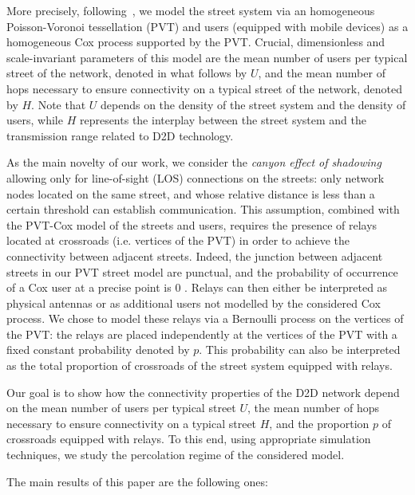 \documentclass[conference]{IEEEtran}
\begin{document}
\noindent More precisely, following~\cite{cali2018percolation}, we model the street system via an  homogeneous  Poisson-Voronoi
tessellation (PVT) and  users (equipped with mobile devices) as a
homogeneous Cox process supported by the PVT. Crucial,
dimensionless and scale-invariant parameters of this model are the mean number of users per
typical street of the network,  denoted in what follows by $U$, 
and the mean number of hops necessary to
ensure connectivity on a typical street of the network, denoted
by $H$. Note that $U$ depends on the density of the street system and the density of users,
while $H$ represents the interplay between the street system 
and the transmission range related to D2D technology.

As the main novelty of our work, we consider  the {\em canyon effect
  of shadowing}  allowing  only for  line-of-sight (LOS) connections
on the streets: only network nodes located on
the  same street, and whose relative distance is less than a certain
threshold can establish communication.
This assumption, combined
with the PVT-Cox  model of the streets and users, requires the presence of relays located
at crossroads (i.e. vertices of the PVT) in order to achieve the connectivity between adjacent
streets. Indeed, the junction between adjacent streets in our PVT street model are punctual, and the probability of occurrence of a Cox user at a precise point is 0 \cite[Section 5.2]{chiu_stochastic_2013}. Relays can then either be interpreted as physical antennas or as additional users not modelled by the considered Cox process.
We chose to model these relays via a Bernoulli process \cite[Section 2.2]{chiu_stochastic_2013}
on the vertices of the PVT: the relays are placed independently at 
the vertices  of the PVT with a fixed constant probability denoted
by $p$. This probability can also be interpreted as the total proportion of crossroads of the street system equipped with relays. 

Our goal is to show how  the  connectivity properties of the D2D network
depend on  the mean number of users per
typical street $U$, the mean number of hops necessary to
ensure connectivity on a typical street $H$, and the  proportion $p$ of
crossroads equipped with relays. 
To this end, using appropriate simulation techniques,  we study  the  percolation regime of the considered
model. 



The main results of this paper are the following ones:
\end{document}
